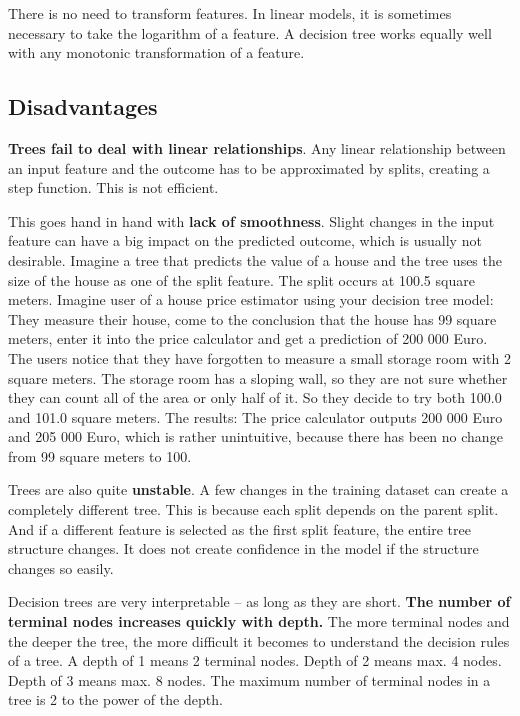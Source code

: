\documentclass[12pt,]{krantz}
\begin{document}
There is no need to transform features. In linear models, it is
sometimes necessary to take the logarithm of a feature. A decision tree
works equally well with any monotonic transformation of a feature.

\subsection{Disadvantages}\label{disadvantages-2}

\textbf{Trees fail to deal with linear relationships}. Any linear
relationship between an input feature and the outcome has to be
approximated by splits, creating a step function. This is not efficient.

This goes hand in hand with \textbf{lack of smoothness}. Slight changes
in the input feature can have a big impact on the predicted outcome,
which is usually not desirable. Imagine a tree that predicts the value
of a house and the tree uses the size of the house as one of the split
feature. The split occurs at 100.5 square meters. Imagine user of a
house price estimator using your decision tree model: They measure their
house, come to the conclusion that the house has 99 square meters, enter
it into the price calculator and get a prediction of 200 000 Euro. The
users notice that they have forgotten to measure a small storage room
with 2 square meters. The storage room has a sloping wall, so they are
not sure whether they can count all of the area or only half of it. So
they decide to try both 100.0 and 101.0 square meters. The results: The
price calculator outputs 200 000 Euro and 205 000 Euro, which is rather
unintuitive, because there has been no change from 99 square meters to
100.

Trees are also quite \textbf{unstable}. A few changes in the training
dataset can create a completely different tree. This is because each
split depends on the parent split. And if a different feature is
selected as the first split feature, the entire tree structure changes.
It does not create confidence in the model if the structure changes so
easily.

Decision trees are very interpretable -- as long as they are short.
\textbf{The number of terminal nodes increases quickly with depth.} The
more terminal nodes and the deeper the tree, the more difficult it
becomes to understand the decision rules of a tree. A depth of 1 means 2
terminal nodes. Depth of 2 means max. 4 nodes. Depth of 3 means max. 8
nodes. The maximum number of terminal nodes in a tree is 2 to the power
of the depth.
\end{document}
